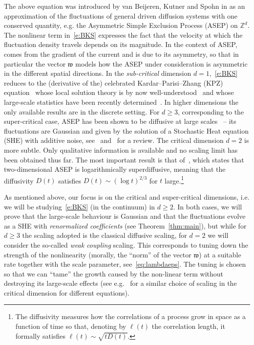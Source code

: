 \documentclass[reqno,11pt]{preprint}
\renewcommand{\Z}{\mathbb{Z}}
\newcommand{\fw}{\mathfrak{w}}
\newcommand{\1}{\mathds{1}}
\begin{document}
The above equation was introduced by van Beijeren, Kutner and Spohn in
\cite{BKS85} as an approximation of the fluctuations of general driven diffusion systems with one conserved quantity, 
e.g. the Asymmetric Simple Exclusion Process (ASEP) on $\Z^d$. 
The nonlinear term in~\eqref{e:BKS} expresses the fact that the velocity at which the fluctuation density 
travels depends on its magnitude. In the context of ASEP, 
comes from the gradient of the current and is due to its asymmetry, so that in particular the vector $\fw$  
models how the ASEP under consideration is asymmetric in the different spatial directions. 
In the {\it sub-critical} dimension $d=1$,~\eqref{e:BKS} reduces to the (derivative of the)  
celebrated Kardar--Parisi--Zhang (KPZ) equation~\cite{Kardar} whose local solution theory is by now 
well-understood~\cite{KPZ,KPZreloaded,GonJara,GPuni} and whose large-scale statistics 
have been recently determined~\cite{QSkpz,Vir}. 
In higher dimensions the only available results are in the 
discrete setting. For $d\geq 3$, corresponding to the super-critical case, 
ASEP has been shown to be diffusive at large scales~\cite{EMY,LY} -- 
its fluctuations are Gaussian 
and given by the solution of a Stochastic Heat equation (SHE) with additive noise,
see~\cite{CLO,LOV} and~\cite{Komorowski2012} for a review. 
The critical dimension $d=2$ is more subtle. Only qualitative information is available and 
no scaling limit has been obtained thus far. The most important result is that of~\cite{Yau}, 
which states that two-dimensional ASEP is logarithmically superdiffusive, 
meaning that the diffusivity $D(t)$ satisfies $D(t)\sim (\log t)^{2/3}$ for $t$ large.\footnote{The diffusivity measures 
how the correlations of a process grow in space as a function of time so that, denoting by $\ell(t)$ 
the correlation length, it formally satisfies $\ell(t)\sim \sqrt{ t D(t)}$. }

As mentioned above, our focus is on the critical and super-critical dimensions, 
i.e. we will be studying~\eqref{e:BKS} (in the continuum) in $d\geq 2$. 
In both cases, we will prove that the large-scale behaviour is Gaussian and that the fluctuations 
evolve as a SHE with {\it renormalized coefficients} (see Theorem~\ref{thm:main}), 
but while for $d\ge3$ the scaling 
adopted is the classical diffusive scaling, for $d=2$ we will consider the so-called {\it weak coupling} 
scaling. This corresponds to tuning down the strength of the nonlinearity (morally, the ``norm'' of the vector $\fw$) 
at a suitable rate together with the scale parameter, see~\eqref{eq:lambdaeps}. 
The tuning is chosen so that we can ``tame'' the 
growth caused by the non-linear term without destroying its large-scale effects  
(see e.g.~\cite{CD,CSZ,Gu2020,CES,CETWeak} for a similar choice of scaling in the critical dimension for different equations). 
\medskip
\end{document}
